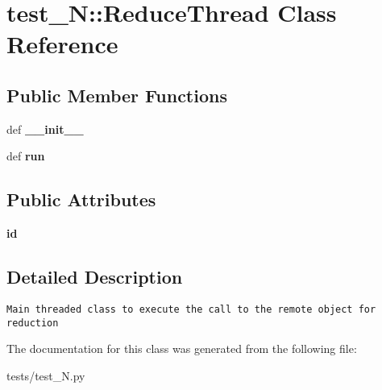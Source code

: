 \section{test\_\-N::Reduce\-Thread Class Reference}
\label{classtest__N_1_1ReduceThread}
\subsection*{Public Member Functions}
\begin{CompactItemize}
\item 
def \textbf{\_\-\_\-init\_\-\_\-}\label{classtest__N_1_1ReduceThread_b555177d10efdefb2191ffac88c4fb24}

\item 
def \textbf{run}\label{classtest__N_1_1ReduceThread_ec03dbbfee34fe7384fdef0054d1a748}

\end{CompactItemize}
\subsection*{Public Attributes}
\begin{CompactItemize}
\item 
\textbf{id}\label{classtest__N_1_1ReduceThread_aee38967c8ad3a95c8496e86f2ff36fe}

\end{CompactItemize}


\subsection{Detailed Description}


\footnotesize\begin{verbatim}
Main threaded class to execute the call to the remote object for reduction
\end{verbatim}
\normalsize
 



The documentation for this class was generated from the following file:\begin{CompactItemize}
\item 
tests/test\_\-N.py\end{CompactItemize}
